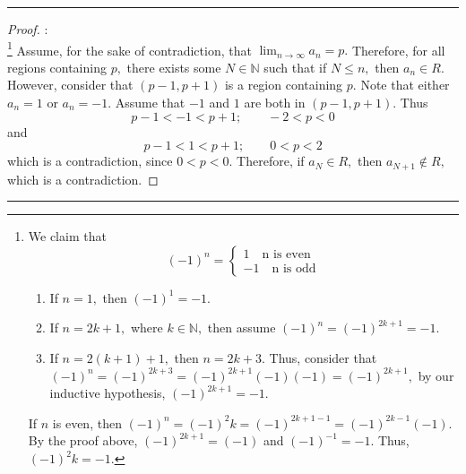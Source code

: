\documentclass[openany, amssymb, psamsfonts]{amsart}
\newcommand{\bbN}{\mathbb{N}}
\theoremstyle{definition}
\numberwithin{equation}{section}
\begin{document}
\vspace{4pt}     \hrule   \vspace{4pt}\begin{proof}:\\
\footnote{We claim that \[(-1)^n = \begin{cases} 1 \quad \text{n is even} \\ -1 \quad \text{n is odd}
\end{cases}\]
\begin{enumerate}
    \item If $n = 1,$ then $(-1)^1 = -1.$
    \item If $n = 2k+1,$ where $k\in \bbN,$ then assume $(-1)^n = (-1)^{2k+1} = -1.$
    \item If $n = 2(k+1) +1,$ then $n = 2k+3.$ Thus, consider that $(-1)^n = (-1)^{2k+3} = (-1)^{2k+1}(-1)(-1) = (-1)^{2k+1},$ by our inductive hypothesis, $(-1)^{2k+1} = -1.$
\end{enumerate}
If $n$ is even, then $(-1)^n = (-1)^2k = (-1)^{2k+1 - 1} = (-1)^{2k-1}(-1).$ By the proof above, $(-1)^{2k+1} = (-1)$ and $(-1)^{-1} = -1.$ Thus, $(-1)^2k = -1.$}
Assume, for the sake of contradiction, that $\displaystyle\lim_{n\to \infty} a_n = p.$ Therefore, for all regions containing $p,$ there exists some $N \in \bbN$ such that if $N\leq n,$ then $a_n \in R.$ However, consider that $(p-1, p+ 1)$ is a region containing $p.$ Note that either $a_n = 1$ or $a_n = -1.$ Assume that $-1$ and $1$ are both in $(p-1, p+1).$ Thus
\[p-1 < -1 < p+1; \qquad -2<p<0\] and \[p-1 < 1 < p+1; \qquad 0<p<2\] which is a contradiction, since $0<p<0.$ Therefore, if $a_N \in R,$ then $a_{N+1}\notin R,$ which is a contradiction.
\end{proof}\vspace{4pt}     \hrule   \vspace{4pt}
\end{document}
